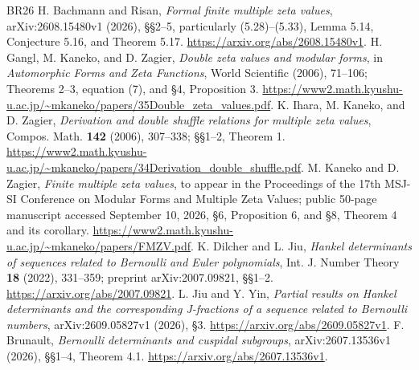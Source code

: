 \documentclass[12pt]{amsart}
\theoremstyle{definition}
\theoremstyle{remark}
\numberwithin{equation}{section}
\theoremstyle{definition}
\theoremstyle{remark}
\begin{document}
\begin{thebibliography}{BR26}
 H. Bachmann and Risan,
\emph{Formal finite multiple zeta values}, arXiv:2608.15480v1 (2026),
\S\S2--5, particularly (5.28)--(5.33), Lemma 5.14,
Conjecture 5.16, and Theorem 5.17.
\url{https://arxiv.org/abs/2608.15480v1}.
 H. Gangl, M. Kaneko, and D. Zagier,
\emph{Double zeta values and modular forms}, in
\emph{Automorphic Forms and Zeta Functions}, World Scientific (2006),
71--106; Theorems 2--3, equation (7), and \S4, Proposition 3.
\url{https://www2.math.kyushu-u.ac.jp/~mkaneko/papers/35Double_zeta_values.pdf}.
 K. Ihara, M. Kaneko, and D. Zagier,
\emph{Derivation and double shuffle relations for multiple zeta values},
Compos. Math. \textbf{142} (2006), 307--338; \S\S1--2, Theorem 1.
\url{https://www2.math.kyushu-u.ac.jp/~mkaneko/papers/34Derivation_double_shuffle.pdf}.
 M. Kaneko and D. Zagier,
\emph{Finite multiple zeta values}, to appear in the Proceedings of the
17th MSJ-SI Conference on Modular Forms and Multiple Zeta Values;
public 50-page manuscript accessed September 10, 2026, \S6,
Proposition 6, and \S8, Theorem 4 and its corollary.
\url{https://www2.math.kyushu-u.ac.jp/~mkaneko/papers/FMZV.pdf}.
 K. Dilcher and L. Jiu,
\emph{Hankel determinants of sequences related to Bernoulli and Euler
polynomials}, Int. J. Number Theory \textbf{18} (2022), 331--359;
preprint arXiv:2007.09821, \S\S1--2.
\url{https://arxiv.org/abs/2007.09821}.
 L. Jiu and Y. Yin,
\emph{Partial results on Hankel determinants and the corresponding
J-fractions of a sequence related to Bernoulli numbers},
arXiv:2609.05827v1 (2026), \S3.
\url{https://arxiv.org/abs/2609.05827v1}.
 F. Brunault,
\emph{Bernoulli determinants and cuspidal subgroups},
arXiv:2607.13536v1 (2026), \S\S1--4, Theorem 4.1.
\url{https://arxiv.org/abs/2607.13536v1}.
\end{thebibliography}
\end{document}
